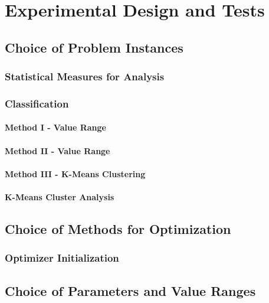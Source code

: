 

\chapter{Experimental Design and Tests}
\label{chap:experiment}

\section{Choice of Problem Instances}

\subsection{Statistical Measures for Analysis}

\subsection{Classification}

\subsubsection{Method I - Value Range }

\subsubsection{Method II - Value Range }

\subsubsection{Method III - K-Means Clustering }

\subsubsection*{K-Means Cluster Analysis}


\section{Choice of Methods for Optimization }

\subsection{Optimizer Initialization}

\section{Choice of Parameters and Value Ranges}

